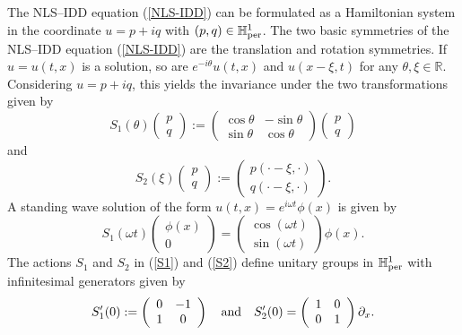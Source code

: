\documentclass[12pt,reqno]{amsart}
\numberwithin{equation}{section}
\numberwithin{figure}{section}
\begin{document}
The NLS--IDD equation (\ref{NLS-IDD}) can be formulated as 
a Hamiltonian system in the coordinate $u = p + i q$ with $(p,q) \in \mathbb{H}^1_{\rm per}$. The two basic symmetries of the NLS--IDD equation (\ref{NLS-IDD}) are the translation and rotation symmetries. If $u = u(t,x)$ is a solution, so are $e^{-i\theta} u(t,x)$ and $u(x-\xi,t)$ for any  $\theta, \xi \in \mathbb{R}$. Considering $u = p + i q$, this yields the invariance under the two transformations given by 
\begin{equation}\label{S1}
S_1(\theta) \left(
\begin{array}{c}
p \\ q
\end{array}
\right) := \left(
\begin{array}{cc}
\cos{\theta} & -\sin{\theta} \\
\sin{\theta} & \cos{\theta}
\end{array}
\right) \left(
\begin{array}{c}
p \\ q
\end{array}
\right)
\end{equation}
and
\begin{equation}\label{S2}
S_2(\xi) \left(
\begin{array}{c}
p \\ q
\end{array}
\right) := \left(
\begin{array}{c}
p(\cdot - \xi, \cdot) \\
q(\cdot - \xi, \cdot)
\end{array}
\right).
\end{equation}
A standing wave solution of the form $u(t,x)=e^{i\omega t}\phi(x)$ is given by
\begin{equation*}
S_1(\omega t)  \left(
\begin{array}{c}
\phi(x) \\
0
\end{array}
\right) = \left(
\begin{array}{c}
\cos(\omega t) \\
\sin(\omega t)
\end{array}
\right) \phi(x).
\end{equation*}
The actions $S_1$ and $S_2$ in (\ref{S1}) and (\ref{S2}) define unitary groups in $\mathbb{H}^1_{\rm per}$ with infinitesimal generators given by
\begin{equation*}
S_1'(0) := \left(
\begin{array}{cc}
0 & -1 \\
1 & 0
\end{array}
\right) \quad \mbox{\rm and} \quad 
S_2'(0) = \left(
\begin{array}{cc}
1 & 0 \\
0 & 1
\end{array}
\right) \partial_x.
\end{equation*}
\end{document}
